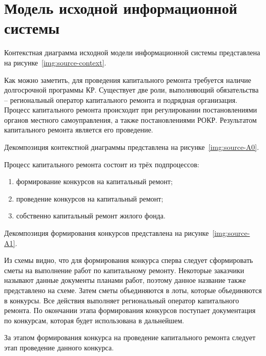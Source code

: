 \section{Модель исходной информационной системы}

Контекстная диаграмма исходной модели информационной системы представлена на рисунке~\ref{img:source-context}.


Как можно заметить, для проведения капитального ремонта требуется наличие долгосрочной программы КР.
Существует две роли, выполняющий обязательства -- региональный оператор капитального ремонта и подрядная организация.
Процесс капитального ремонта происходит при регулировании постановлениями органов местного самоуправления, а также постановлениями РОКР.
Результатом капитального ремонта является его проведение.

Декомпозиция контекстной диаграммы представлена на рисунке~\ref{img:source-A0}.


Процесс капитального ремонта состоит из трёх подпроцессов:

\begin{enumerate}
	\item формирование конкурсов на капитальный ремонт;
	\item проведение конкурсов на капитальный ремонт;
	\item собственно капитальный ремонт жилого фонда.
\end{enumerate}

Декомпозиция формирования конкурсов представлена на рисунке~\ref{img:source-A1}.


Из схемы видно, что для формирования конкурса сперва следует сформировать сметы на выполнение работ по капитальному ремонту.
Некоторые заказчики называют данные документы планами работ, поэтому данное название также представлено на схеме.
Затем сметы объединяются в лоты, которые объединяются в конкурсы.
Все действия выполняет региональный оператор капитального ремонта.
По окончании этапа формирования конкурсов поступает документация по конкурсам, которая будет использована в дальнейшем.

За этапом формирования конкурса на проведение капитального ремонта следует этап проведение данного конкурса.

